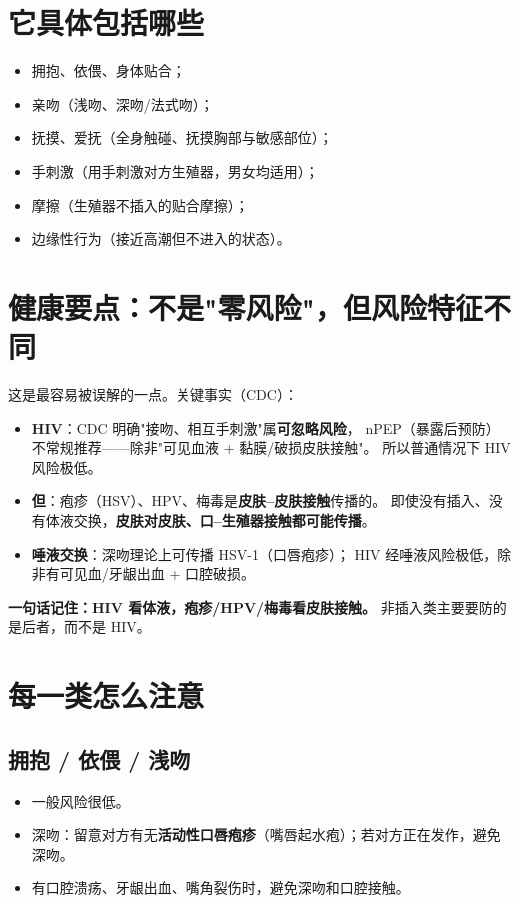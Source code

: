 \section{它具体包括哪些}

\begin{itemize}[leftmargin=2em]
  \item 拥抱、依偎、身体贴合；
  \item 亲吻（浅吻、深吻/法式吻）；
  \item 抚摸、爱抚（全身触碰、抚摸胸部与敏感部位）；
  \item 手刺激（用手刺激对方生殖器，男女均适用）；
  \item 摩擦（生殖器不插入的贴合摩擦）；
  \item 边缘性行为（接近高潮但不进入的状态）。
\end{itemize}

\section{健康要点：不是"零风险"，但风险特征不同}

这是最容易被误解的一点。关键事实（CDC）：

\begin{itemize}[leftmargin=2em]
  \item \textbf{HIV}：CDC 明确"接吻、相互手刺激"属\textbf{可忽略风险}，
        nPEP（暴露后预防）不常规推荐——除非"可见血液 + 黏膜/破损皮肤接触"。
        所以普通情况下 HIV 风险极低。
  \item \textbf{但}：疱疹（HSV）、HPV、梅毒是\textbf{皮肤--皮肤接触}传播的。
        即使没有插入、没有体液交换，\textbf{皮肤对皮肤、口--生殖器接触都可能传播}。
  \item \textbf{唾液交换}：深吻理论上可传播 HSV-1（口唇疱疹）；
        HIV 经唾液风险极低，除非有可见血/牙龈出血 + 口腔破损。
\end{itemize}

\textbf{一句话记住：HIV 看体液，疱疹/HPV/梅毒看皮肤接触。}
非插入类主要要防的是后者，而不是 HIV。

\section{每一类怎么注意}

\subsection*{拥抱 / 依偎 / 浅吻}

\begin{itemize}[leftmargin=2em]
  \item 一般风险很低。
  \item 深吻：留意对方有无\textbf{活动性口唇疱疹}（嘴唇起水疱）；若对方正在发作，避免深吻。
  \item 有口腔溃疡、牙龈出血、嘴角裂伤时，避免深吻和口腔接触。
\end{itemize}

